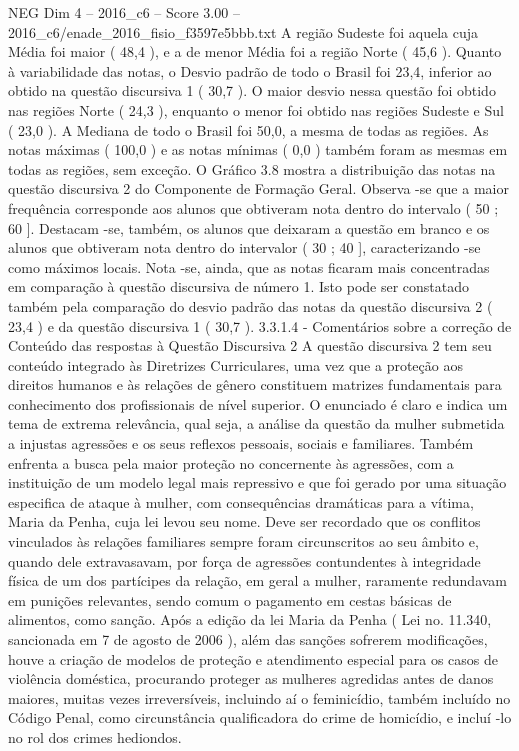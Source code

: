 \begin{textsample}{NEG Dim 4 – 2016\_c6 – Score 3.00 – 2016\_c6/enade\_2016\_fisio\_f3597e5bbb.txt}
A região Sudeste foi aquela cuja Média foi maior ( 48,4 ), e a de menor Média foi a região Norte ( 45,6 ).
Quanto à variabilidade das notas, o Desvio padrão de todo o Brasil foi 23,4, inferior ao obtido na questão discursiva 1 ( 30,7 ).
O maior desvio nessa questão foi obtido nas regiões Norte ( 24,3 ), enquanto o menor foi obtido nas regiões Sudeste e Sul ( 23,0 ).
A Mediana de todo o Brasil foi 50,0, a mesma de todas as regiões.
As notas máximas ( 100,0 ) e as notas mínimas ( 0,0 ) também foram as mesmas em todas as regiões, sem exceção.
O Gráfico 3.8 mostra a distribuição das notas na questão discursiva 2 do Componente de Formação Geral.
Observa -se que a maior frequência corresponde aos alunos que obtiveram nota dentro do intervalo ( 50 ; 60 ].
Destacam -se, também, os alunos que deixaram a questão em branco e os alunos que obtiveram nota dentro do intervalor ( 30 ; 40 ], caracterizando -se como máximos locais.
Nota -se, ainda, que as notas ficaram mais concentradas em comparação à questão discursiva de número 1.
Isto pode ser constatado também pela comparação do desvio padrão das notas da questão discursiva 2 ( 23,4 ) e da questão discursiva 1 ( 30,7 ). 3.3.1.4 - Comentários sobre a correção de Conteúdo das respostas à Questão Discursiva 2 A questão discursiva 2 tem seu conteúdo integrado às Diretrizes Curriculares, uma vez que a proteção aos direitos humanos e às relações de gênero constituem matrizes fundamentais para conhecimento dos profissionais de nível superior.
O enunciado é claro e indica um tema de extrema relevância, qual seja, a análise da questão da mulher submetida a injustas agressões e os seus reflexos pessoais, sociais e familiares.
Também enfrenta a busca pela maior proteção no concernente às agressões, com a instituição de um modelo legal mais repressivo e que foi gerado por uma situação especifica de ataque à mulher, com consequências dramáticas para a vítima, Maria da Penha, cuja lei levou seu nome.
Deve ser recordado que os conflitos vinculados às relações familiares sempre foram circunscritos ao seu âmbito e, quando dele extravasavam, por força de agressões contundentes à integridade física de um dos partícipes da relação, em geral a mulher, raramente redundavam em punições relevantes, sendo comum o pagamento em cestas básicas de alimentos, como sanção.
Após a edição da lei Maria da Penha ( Lei no. 11.340, sancionada em 7 de agosto de 2006 ), além das sanções sofrerem modificações, houve a criação de modelos de proteção e atendimento especial para os casos de violência doméstica, procurando proteger as mulheres agredidas antes de danos maiores, muitas vezes irreversíveis, incluindo aí o feminicídio, também incluído no Código Penal, como circunstância qualificadora do crime de homicídio, e incluí -lo no rol dos crimes hediondos.

\end{textsample}

